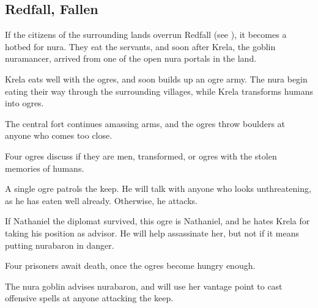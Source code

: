 \subsection{Redfall, Fallen}
\label{redfallFallen}


If the citizens of the surrounding lands overrun Redfall (see ), it becomes a hotbed for nura.
They eat the servants, and soon after Krela, the goblin nuramancer, arrived from one of the open nura portals in the land.

Krela eats well with the ogres, and soon builds up an ogre army.
The nura begin eating their way through the surrounding villages, while Krela transforms humans into ogres.

The central fort continues amassing arms, and the ogres throw boulders at anyone who comes too close.


Four ogres discuss if they are men, transformed, or ogres with the stolen memories of humans.



A single ogre patrols the keep.
He will talk with anyone who looks unthreatening, as he has eaten well already.
Otherwise, he attacks.

If Nathaniel the diplomat survived, this ogre is Nathaniel, and he hates Krela for taking his position as advisor.
He will help assassinate her, but not if it means putting \gls{nurabaron} in danger.



Four prisoners await death, once the ogres become hungry enough.


The nura goblin advises \gls{nurabaron}, and will use her vantage point to cast offensive spells at anyone attacking the keep.




